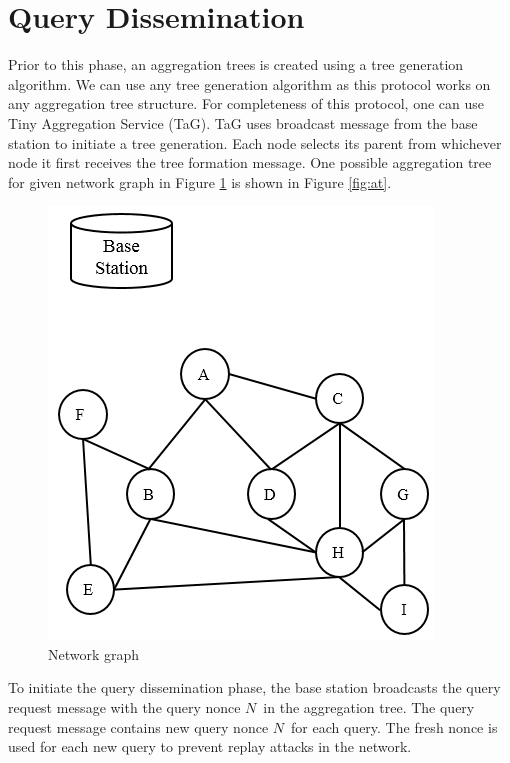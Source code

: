 \section{Query Dissemination}
	\label{sec:query-dissemination}
	Prior to this phase, an aggregation trees is created using a tree generation algorithm.
	We can use any tree generation algorithm as this protocol works on any aggregation tree structure.
	For completeness of this protocol, one can use Tiny Aggregation Service (TaG)\cite{madden2002tag}.
	TaG uses broadcast message from the base station to initiate a tree generation.
	Each node selects its parent from whichever node it first receives the tree formation message.
	One possible aggregation tree for given network graph in Figure \ref{fig:ng} is shown in Figure \ref{fig:at}. 
	\begin{figure}[h!]
		\centering
		\includegraphics[scale = 1]{images/network-graph.png}
		\caption{Network graph}
		\label{fig:ng}
	\end{figure}
	To initiate the query dissemination phase, the base station broadcasts the query request message with the query nonce $N$\ in the aggregation tree. 
	The query request message contains new query nonce $N$\ for each query.
	The fresh nonce is used for each new query to prevent replay attacks in the network.
